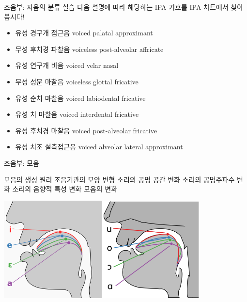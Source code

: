\documentclass[11pt, aspectratio=169]{beamer}
\newcommand{\textds}[1]{{\ipafont #1}}
\begin{document}
\begin{frame}[t]{조음부: 자음의 분류 실습}
    다음 설명에 따라 해당하는 IPA 기호를 IPA 차트에서 찾아봅시다!
    \begin{itemize}
        \item 유성 경구개 접근음 voiced palatal approximant \textds{[ ]}
        \item 무성 후치경 파찰음 voiceless post-alveolar affricate \textds{[ ]}
        \item 유성 연구개 비음 voiced velar nasal \textds{[ ]}
        \item 무성 성문 마찰음 voiceless glottal fricative \textds{[ ]}
        \item 유성 순치 마찰음 voiced labiodental fricative \textds{[ ]}
        \item 유성 치 마찰음 voiced interdental fricative \textds{[ ]}
        \item 유성 후치경 마찰음 voiced post-alveolar fricative  \textds{[ ]}
        \item 유성 치조 설측접근음 voiced alveolar lateral approximant \textds{[ ]}
    \end{itemize}
\end{frame}

\begin{frame}[t]{조음부: 모음}
    \begin{block}{모음의 생성 원리}
        조음기관의 모양 변형 \rightarrow 소리의 공명 공간 변화 \rightarrow 소리의 공명주파수 변화 \rightarrow 소리의 음향적 특성 변화 \rightarrow 모음의 변화
    \end{block}
    \centering
    \includegraphics[width=0.4\textwidth]{img/Cardinal_vowel_tongue_position-front.svg.png}\includegraphics[width=0.4\textwidth]{img/Cardinal_vowel_tongue_position-back.svg.png}
\end{frame}
\end{document}
